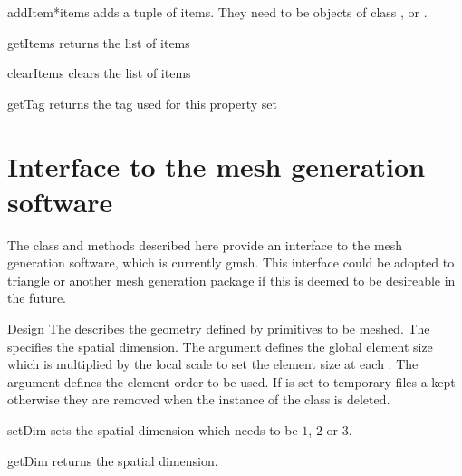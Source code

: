 \begin{methoddesc}[PropertySet]{addItem}{*items}
adds a tuple of items. They need to be objects of class \ManifoldOneD, \ManifoldTwoD or \ManifoldThreeD. 
\end{methoddesc}

\begin{methoddesc}[PropertySet]{getItems}{}
returns the list of items
\end{methoddesc}

\begin{methoddesc}[PropertySet]{clearItems}{}
clears the list of items 
\end{methoddesc}

\begin{methoddesc}[PropertySet]{getTag}{}
returns the tag used for this property set
\end{methoddesc}

\section{Interface to the mesh generation software}

The class and methods described here provide an interface to the mesh
generation software, which is currently gmsh.  This interface could be
adopted to triangle or another mesh generation package if this is
deemed to be desireable in the future.

\begin{classdesc}{Design}{
}
The  describes the geometry defined by primitives to be meshed.
The  specifies the spatial dimension. The argument  defines the global
element size which is multiplied by the local scale to set the element size at each \Point. 
The argument  defines the element order to be used. If  is set to 
\True temporary files a kept otherwise they are removed when the instance of the class is deleted. 
\end{classdesc}


\begin{methoddesc}[Design]{setDim}{}
sets the spatial dimension which needs to be $1$, $2$ or $3$.
\end{methoddesc}

\begin{methoddesc}[Design]{getDim}{}
returns the spatial dimension.
\end{methoddesc}

